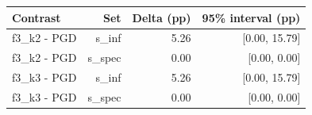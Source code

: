 \begin{tabular}{lrrr}
\toprule
Contrast & Set & Delta (pp) & 95\% interval (pp) \\
\midrule
f3\_k2 - PGD & s\_inf & 5.26 & [0.00, 15.79] \\
f3\_k2 - PGD & s\_spec & 0.00 & [0.00, 0.00] \\
f3\_k3 - PGD & s\_inf & 5.26 & [0.00, 15.79] \\
f3\_k3 - PGD & s\_spec & 0.00 & [0.00, 0.00] \\
\bottomrule
\end{tabular}

